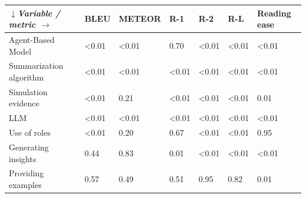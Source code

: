 \begin{tabular}{|l|l|l|l|l|l|l|}
\hline
\textit{$\downarrow$Variable / metric $\rightarrow$} & BLEU & METEOR & R-1 & R-2 & R-L & Reading ease \\
 \hline
 Agent-Based Model & \textless{}0.01 & \textless{}0.01 & 0.70 & \textless{}0.01 & \textless{}0.01 & \textless{}0.01 \\
 \hline
 Summarization algorithm & \textless{}0.01 & \textless{}0.01 & \textless{}0.01 & \textless{}0.01 & \textless{}0.01 & \textless{}0.01 \\
 \hline
 Simulation evidence & \textless{}0.01 & 0.21 & \textless{}0.01 & \textless{}0.01 & \textless{}0.01 & 0.01 \\
 \hline
 LLM & \textless{}0.01 & \textless{}0.01 & \textless{}0.01 & \textless{}0.01 & \textless{}0.01 & \textless{}0.01 \\
 \hline
 Use of roles & \textless{}0.01 & 0.20 & 0.67 & \textless{}0.01 & \textless{}0.01 & 0.95 \\
 \hline
 Generating insights & 0.44 & 0.83 & 0.01 & \textless{}0.01 & \textless{}0.01 & \textless{}0.01 \\
 \hline
 Providing examples & 0.57 & 0.49 & 0.51 & 0.95 & 0.82 & 0.01 \\
\hline
\end{tabular}
